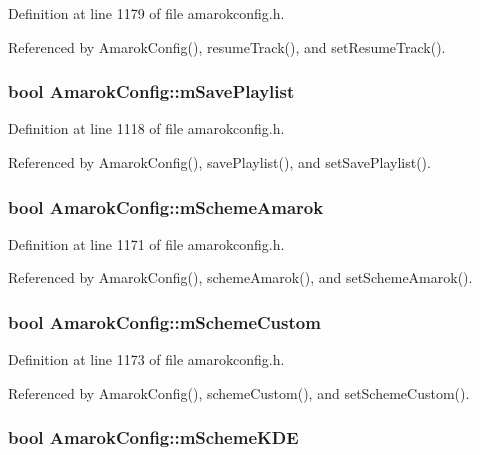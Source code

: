 Definition at line 1179 of file amarokconfig.h.

Referenced by Amarok\-Config(), resume\-Track(), and set\-Resume\-Track().
\subsubsection{\setlength{\rightskip}{0pt plus 5cm}bool {\bf Amarok\-Config::m\-Save\-Playlist}\hspace{0.3cm}{\tt  [protected]}}\label{classAmarokConfig_AmarokConfigp4}




Definition at line 1118 of file amarokconfig.h.

Referenced by Amarok\-Config(), save\-Playlist(), and set\-Save\-Playlist().
\subsubsection{\setlength{\rightskip}{0pt plus 5cm}bool {\bf Amarok\-Config::m\-Scheme\-Amarok}\hspace{0.3cm}{\tt  [protected]}}\label{classAmarokConfig_AmarokConfigp49}




Definition at line 1171 of file amarokconfig.h.

Referenced by Amarok\-Config(), scheme\-Amarok(), and set\-Scheme\-Amarok().
\subsubsection{\setlength{\rightskip}{0pt plus 5cm}bool {\bf Amarok\-Config::m\-Scheme\-Custom}\hspace{0.3cm}{\tt  [protected]}}\label{classAmarokConfig_AmarokConfigp51}




Definition at line 1173 of file amarokconfig.h.

Referenced by Amarok\-Config(), scheme\-Custom(), and set\-Scheme\-Custom().
\subsubsection{\setlength{\rightskip}{0pt plus 5cm}bool {\bf Amarok\-Config::m\-Scheme\-KDE}\hspace{0.3cm}{\tt  [protected]}}\label{classAmarokConfig_AmarokConfigp50}




